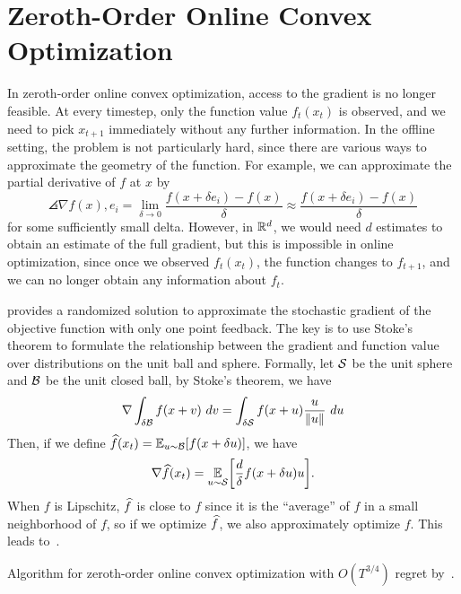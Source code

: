\documentclass[11pt]{article}
\begin{document}
\section{Zeroth-Order Online Convex Optimization}

In zeroth-order online convex optimization, access to the gradient is no longer feasible.
At every timestep, only the function value $f_t(x_t)$ is observed, and we need to pick $x_{t+1}$ immediately without any further information.
In the offline setting, the problem is not particularly hard, since there are various ways to approximate the geometry of the function.
For example, we can approximate the partial derivative of $f$ at $x$ by
\[
    \angles{\nabla f(x), e_i} = \lim_{\delta \to 0} \frac{f(x + \delta e_i) - f(x)}{\delta} \approx \frac{f(x + \delta e_i) - f(x)}{\delta}
\]
for some sufficiently small delta. However, in $\mathbb{R}^d$, we would need $d$ estimates to obtain an estimate of the full gradient, but this is impossible in online optimization, since once we observed $f_t(x_t)$, the function changes to $f_{t+1}$, and we can no longer obtain any information about $f_t$.

\cite{flaxman2005online} provides a randomized solution to approximate the stochastic gradient of the objective function with only one point feedback. The key is to use Stoke's theorem to formulate the relationship between the gradient and function value over distributions on the unit ball and sphere. Formally, let $\mathcal{S}$ be the unit sphere and $\mathcal{B}$ be the unit closed ball, by Stoke's theorem, we have
\[
    \nabla \int_{\delta\mathcal{B}} f(x + v)~dv = \int_{\delta\mathcal{S}} f(x + u) \frac{u}{\lVert u\rVert}~du
\]
Then, if we define $\widehat{f}(x_t) = \operatorname*{\mathbb{E}}_{u \sim \mathcal{B}}[f(x + \delta u)]$, we have
\begin{equation}
    \nabla \wh{f}(x_t) = \E_{u \sim \Sc}\bracks*{\frac{d}{\delta}f(x + \delta u)u}.
\end{equation}
When $f$ is Lipschitz, $\widehat{f}$ is close to $f$ since it is the ``average'' of $f$ in a small neighborhood of $f$, so if we optimize $\widehat{f}$, we also approximately optimize $f$.
This leads to~.
\begin{algorithm}
    \begin{algorithmic}
        \EndFor
    \end{algorithmic}
    \caption{Algorithm for zeroth-order online convex optimization with $O(T^{3/4})$ regret by~\cite{flaxman2005online}.}
    \label{alg1}
\end{algorithm}
\end{document}
